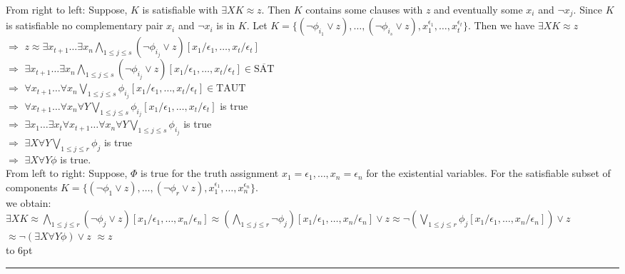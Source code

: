 \documentclass[12pt]{article}
\newenvironment{proof}{\parindent=0pt{\bf Proof: }}{
   \hspace*{\fill}\hbox to 6pt{\leaders\hrule width 6pt height 6pt\hfill}\par}
\begin{document}
\begin{proof}
From right to left: Suppose, $K$ is satisfiable with $\exists X K \approx z$. Then $K$ contains some clauses with $z$ and eventually some $x_i$ and $\neg x_j$. Since $K$ is satisfiable no complementary pair $x_i$ and $\neg x_i$ is in $K$.
Let $K= \{(\neg \phi_{i_1} \vee z), \ldots, (\neg \phi_{i_s} \vee z), x_1^{\epsilon_1}, \ldots, x_t^{\epsilon_t}\}.$
Then we have
$\exists X K \approx z$ \\
$\Longrightarrow$
$z \approx \exists x_{t+1} \ldots \exists x_n \bigwedge_{1 \leq j \leq s} (\neg \phi_{i_j} \vee z)[x_1/\epsilon_1, \ldots, x_t/\epsilon_t]$\\
$\Longrightarrow$
$\exists x_{t+1} \ldots \exists x_n \bigwedge_{1 \leq j \leq s} (\neg \phi_{i_j} \vee z)[x_1/\epsilon_1, \ldots, x_t/\epsilon_t]\in
\overline{\mbox{SAT}}$\\
$\Longrightarrow$
$\forall x_{t+1} \ldots \forall x_n \bigvee_{1 \leq j \leq s} \phi_{i_j}[x_1/\epsilon_1, \ldots, x_t/\epsilon_t]
\in
\mbox{TAUT}$\\
$\Longrightarrow$
$\forall x_{t+1} \ldots \forall x_n \forall Y \bigvee_{1 \leq j \leq s} \phi_{i_j}[x_1/\epsilon_1, \ldots, x_t/\epsilon_t]$
is true\\
$\Longrightarrow$
$\exists x_1 \ldots \exists x_t \forall x_{t+1} \ldots \forall x_n \forall Y \bigvee_{1 \leq j \leq s} \phi_{i_j}$
is true\\
$\Longrightarrow$
$\exists X \forall Y \bigvee_{1 \leq j \leq r} \phi_{j}$
is true\\
$\Longrightarrow$ $\exists X \forall Y \phi$ is true.\\

From left to right:
Suppose, $\Phi$ is true for the truth assignment $x_1= \epsilon_1, \ldots, x_n= \epsilon_n$ for the existential variables. For the satisfiable subset of components
$K=\{ (\neg \phi_1 \vee z), \ldots, (\neg \phi_r \vee z), x_1^{\epsilon_1}, \ldots, x_n^{\epsilon_n}\}$.\\
we obtain:\\
$\exists X K \approx \bigwedge_{1 \leq j \leq r} (\neg \phi_j \vee z)[x_1/\epsilon_1, \ldots, x_n/\epsilon_n]
\approx (\bigwedge_{1 \leq j \leq r} \neg \phi_j)[x_1/\epsilon_1, \ldots, x_n/\epsilon_n] \vee z
\approx  \neg (\bigvee_{1 \leq j \leq r} \phi_j[x_1/\epsilon_1, \ldots, x_n/\epsilon_n]) \vee z$\\
$\approx \neg (\exists X \forall Y \phi) \vee z$ $\approx z$\\



\end{proof}
\end{document}
